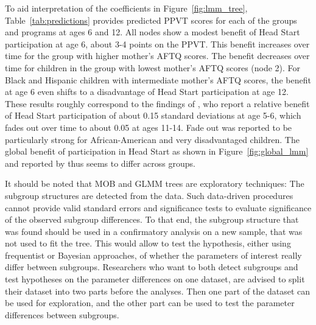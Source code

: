 \documentclass[doc,floatsintext,natbib]{apa7}
\newcommand{\edc}[1]{\textcolor{blue}{#1}}
\begin{document}
To aid interpretation of the coefficients in Figure~\ref{fig:lmm_tree}, Table~\ref{tab:predictions} provides predicted PPVT scores for each of the groups and programs at ages 6 and 12. All nodes show a modest benefit of Head Start participation at age 6, about 3-4 points on the PPVT. This benefit increases over time for the group with higher mother's AFTQ scores. The benefit decreases over time for children in the group with lowest mother's AFTQ scores (node 2). For Black and Hispanic children with intermediate mother's AFTQ scores, the benefit at age 6 even shifts to a disadvantage of Head Start participation at age 12. These results roughly correspond to the findings of \cite{Demi09}, who report a relative benefit of Head Start participation of about 0.15 standard deviations at age 5-6, which fades out over time to about 0.05 at ages 11-14. Fade out was reported to be particularly strong for African-American and very disadvantaged children. The global benefit of participation in Head Start as shown in Figure~\ref{fig:global_lmm} and reported by \cite{Demi09} thus seems to differ across groups.

It should be noted that MOB and GLMM trees are exploratory techniques: The subgroup structures are detected from the data. Such data-driven procedures cannot provide valid standard errors and significance tests to evaluate significance of the observed subgroup differences. To that end, the subgroup structure that was found should be used in a confirmatory analysis on a new sample, that was not used to fit the tree. This would allow to test the hypothesis, either using frequentist or Bayesian approaches, of whether the parameters of interest really differ between subgroups. Researchers who want to both detect subgroups and test hypotheses on the parameter differences on one dataset, are advised to split their dataset into two parts before the analyses. Then one part of the dataset can be used for exploration, and the other part can be used to test the parameter differences between subgroups. 

\end{document}
